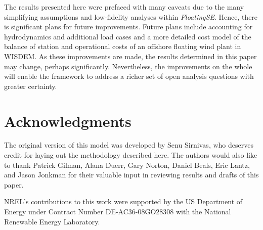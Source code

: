 The results presented here were prefaced with many caveats due to the
many simplifying assumptions and low-fidelity analyses within
\textit{FloatingSE}.  Hence, there is significant plans for future
improvements.  Future plans include accounting for hydrodynamics and
additional load cases and a more detailed cost model of the balance of
station and operational costs of an offshore floating wind plant in
WISDEM.  As these improvements are made, the results determined in this
paper may change, perhaps significantly.  Nevertheless, the improvements
on the whole will enable the framework to address a richer set of open
analysis questions with greater certainty.

\section*{Acknowledgments}
The original version of this model was developed by Senu Sirnivas, who
deserves credit for laying out the methodology described here.  The
authors would also like to thank Patrick Gilman, Alana Duerr, Gary
Norton, Daniel Beals, Eric Lantz, and Jason Jonkman for their valuable
input in reviewing results and drafts of this paper.

NREL’s contributions to this work were supported by the US Department of
Energy under Contract Number DE-AC36-08GO28308 with the National
Renewable Energy Laboratory.

